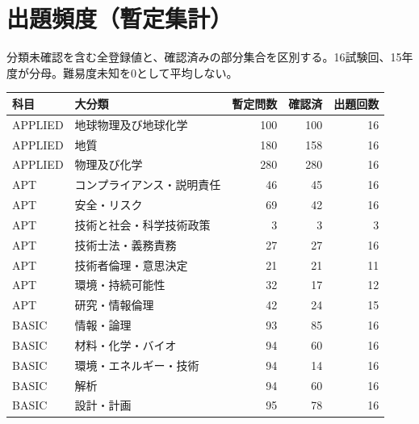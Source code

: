 \chapter{出題頻度（暫定集計）}
分類未確認を含む全登録値と、確認済みの部分集合を区別する。16試験回、15年度が分母。難易度未知を0として平均しない。
\begin{longtable}{p{.16\linewidth}p{.42\linewidth}rrr}
科目 & 大分類 & 暫定問数 & 確認済 & 出題回数\\\hline
APPLIED & 地球物理及び地球化学 & 100 & 100 & 16\\
APPLIED & 地質 & 180 & 158 & 16\\
APPLIED & 物理及び化学 & 280 & 280 & 16\\
APT & コンプライアンス・説明責任 & 46 & 45 & 16\\
APT & 安全・リスク & 69 & 42 & 16\\
APT & 技術と社会・科学技術政策 & 3 & 3 & 3\\
APT & 技術士法・義務責務 & 27 & 27 & 16\\
APT & 技術者倫理・意思決定 & 21 & 21 & 11\\
APT & 環境・持続可能性 & 32 & 17 & 12\\
APT & 研究・情報倫理 & 42 & 24 & 15\\
BASIC & 情報・論理 & 93 & 85 & 16\\
BASIC & 材料・化学・バイオ & 94 & 60 & 16\\
BASIC & 環境・エネルギー・技術 & 94 & 14 & 16\\
BASIC & 解析 & 94 & 60 & 16\\
BASIC & 設計・計画 & 95 & 78 & 16\\
\end{longtable}

